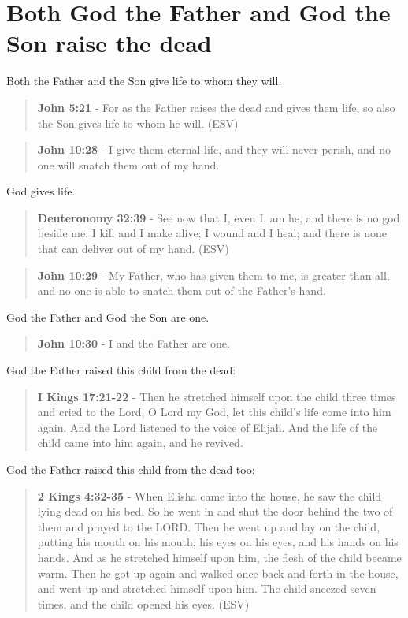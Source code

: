 \documentclass[11pt]{article}
\begin{document}
\section{Both God the Father and God the Son raise the dead}
\label{sec:org2c1acfb}
Both the Father and the Son give life to whom they will.

\begin{quote}
\textbf{John 5:21} - For as the Father raises the dead and gives them life, so also the Son gives life to whom he will. (ESV)
\end{quote}

\begin{quote}
\textbf{John 10:28} - I give them eternal life, and they will never perish, and no one will snatch them out of my hand.
\end{quote}

God gives life.

\begin{quote}
\textbf{Deuteronomy 32:39} - See now that I, even I, am he, and there is no god beside me; I kill and I make alive; I wound and I heal; and there is none that can deliver out of my hand. (ESV)
\end{quote}

\begin{quote}
\textbf{John 10:29} - My Father, who has given them to me, is greater than all, and no one is able to snatch them out of the Father's hand.
\end{quote}

God the Father and God the Son are one.

\begin{quote}
\textbf{John 10:30} - I and the Father are one.
\end{quote}

God the Father raised this child from the dead:

\begin{quote}
\textbf{I Kings 17:21-22} - Then he stretched himself upon the child three times and cried to the Lord, O Lord my God, let this child's life come into him again. And the Lord listened to the voice of Elijah. And the life of the child came into him again, and he revived.
\end{quote}

God the Father raised this child from the dead too:

\begin{quote}
\textbf{2 Kings 4:32-35} -  When Elisha came into the house, he saw the child lying dead on his bed.  So he went in and shut the door behind the two of them and prayed to the LORD.  Then he went up and lay on the child, putting his mouth on his mouth, his eyes on his eyes, and his hands on his hands.  And as he stretched himself upon him, the flesh of the child became warm.  Then he got up again and walked once back and forth in the house, and went up and stretched himself upon him. The child sneezed seven times, and the child opened his eyes.  (ESV)
\end{quote}
\end{document}
